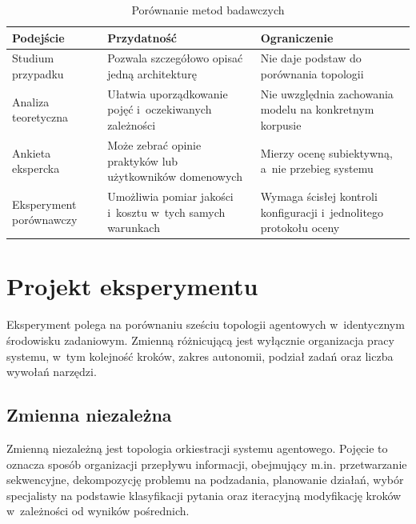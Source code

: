 \begin{table}[H]
  \caption{Porównanie metod badawczych}\label{tab:porownanie-metod-badawczych}
  \centering
  \small
  \begin{tabularx}{\textwidth}{@{} p{3.2cm} L L @{}}
    \toprule
    \textbf{Podejście}
    & \textbf{Przydatność}
    & \textbf{Ograniczenie}                                              \\
    \midrule
    Studium przypadku
    & Pozwala szczegółowo opisać jedną architekturę
    & Nie daje podstaw do porównania topologii                           \\
    \addlinespace
    Analiza teoretyczna
    & Ułatwia uporządkowanie pojęć i~oczekiwanych zależności
    & Nie uwzględnia zachowania modelu na konkretnym korpusie            \\
    \addlinespace
    Ankieta ekspercka
    & Może zebrać opinie praktyków lub użytkowników domenowych
    & Mierzy ocenę subiektywną, a~nie przebieg systemu                   \\
    \addlinespace
    Eksperyment porównawczy
    & Umożliwia pomiar jakości i~kosztu w~tych samych warunkach
    & Wymaga ścisłej kontroli konfiguracji i~jednolitego protokołu oceny \\
    \bottomrule
  \end{tabularx}
\end{table}

\section{Projekt eksperymentu}\label{sec:projekt-eksperymentu}

Eksperyment polega na porównaniu sześciu topologii agentowych w~identycznym
środowisku zadaniowym. Zmienną różnicującą jest wyłącznie organizacja pracy
systemu, w~tym kolejność kroków, zakres autonomii, podział zadań oraz liczba
wywołań narzędzi.

\subsection{Zmienna niezależna}\label{subsec:zmienna-niezalezna}

Zmienną niezależną jest topologia orkiestracji systemu agentowego. Pojęcie to
oznacza sposób organizacji przepływu informacji, obejmujący m.in. przetwarzanie
sekwencyjne, dekompozycję problemu na podzadania, planowanie działań, wybór
specjalisty na podstawie klasyfikacji pytania oraz iteracyjną modyfikację
kroków w~zależności od wyników pośrednich.

